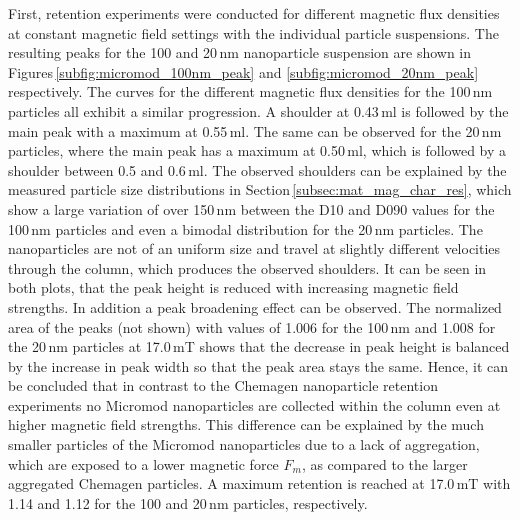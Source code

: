 First, retention experiments were conducted for different magnetic flux densities at constant magnetic field settings with the individual particle suspensions. The resulting peaks for the 100 and 20\,nm nanoparticle suspension are shown in Figures\,\ref{subfig:micromod_100nm_peak} and \ref{subfig:micromod_20nm_peak} respectively. The curves for the different magnetic flux densities for the 100\,nm particles all exhibit a similar progression. A shoulder at 0.43\,ml is followed by the main peak with a maximum at 0.55\,ml. The same can be observed for the 20\,nm particles, where the main peak has a maximum at 0.50\,ml, which is followed by a shoulder between 0.5 and 0.6\,ml. The observed shoulders can be explained by the measured particle size distributions in Section\,\ref{subsec:mat_mag_char_res}, which show a large variation of over 150\,nm between the D10 and D090 values for the 100\,nm particles and even a bimodal distribution for the 20\,nm particles. The nanoparticles are not of an uniform size and travel at slightly different velocities through the column, which produces the observed shoulders. 
It can be seen in both plots, that the peak height is reduced with increasing magnetic field strengths. In addition a peak broadening effect can be observed. The normalized area of the peaks (not shown) with values of 1.006 for the 100\,nm and 1.008 for the 20\,nm particles at 17.0\,mT shows that the decrease in peak height is balanced by the increase in peak width so that the peak area stays the same. Hence, it can be concluded that in contrast to the Chemagen nanoparticle retention experiments no Micromod nanoparticles are collected within the column even at higher magnetic field strengths. This difference can be explained by the much smaller particles of the Micromod nanoparticles due to a lack of aggregation, which are exposed to a lower magnetic force $F_{m}$, as compared to the larger aggregated Chemagen particles. A maximum retention is reached at 17.0\,mT with 1.14 and 1.12 for the 100 and 20\,nm particles, respectively.

